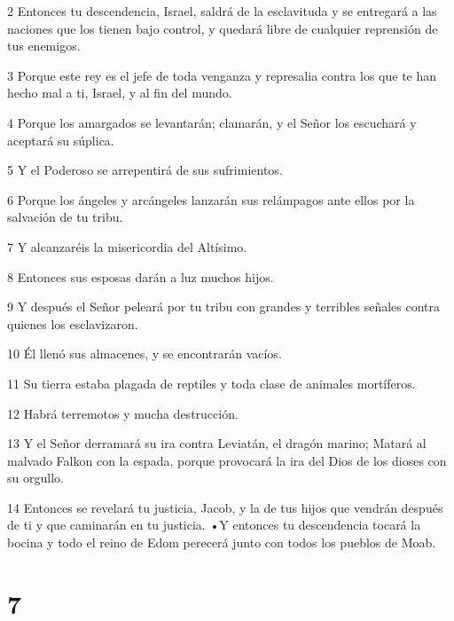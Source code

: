 \par 2 Entonces tu descendencia, Israel, saldrá de la esclavituda y se entregará a las naciones que los tienen bajo control, y quedará libre de cualquier reprensión de tus enemigos.

\par 3 Porque este rey es el jefe de toda venganza y represalia contra los que te han hecho mal a ti, Israel, y al fin del mundo.

\par 4 Porque los amargados se levantarán; clamarán, y el Señor los escuchará y aceptará su súplica.

\par 5 Y el Poderoso se arrepentirá de sus sufrimientos.

\par 6 Porque los ángeles y arcángeles lanzarán sus relámpagos ante ellos por la salvación de tu tribu.

\par 7 Y alcanzaréis la misericordia del Altísimo.

\par 8 Entonces sus esposas darán a luz muchos hijos.

\par 9 Y después el Señor peleará por tu tribu con grandes y terribles señales contra quienes los esclavizaron.

\par 10 Él llenó sus almacenes, y se encontrarán vacíos.

\par 11 Su tierra estaba plagada de reptiles y toda clase de animales mortíferos.

\par 12 Habrá terremotos y mucha destrucción.

\par 13 Y el Señor derramará su ira contra Leviatán, el dragón marino; Matará al malvado Falkon con la espada, porque provocará la ira del Dios de los dioses con su orgullo.

\par 14 Entonces se revelará tu justicia, Jacob, y la de tus hijos que vendrán después de ti y que caminarán en tu justicia. •Y entonces tu descendencia tocará la bocina y todo el reino de Edom perecerá junto con todos los pueblos de Moab.

\chapter{7}

